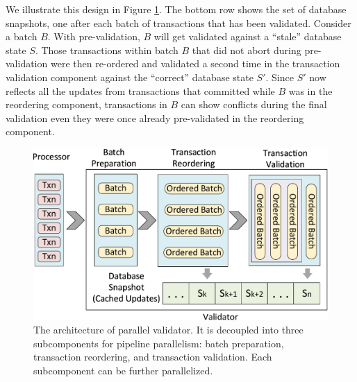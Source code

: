 We illustrate this design in Figure \ref{fig:reorder:validator}. The bottom row shows the set of database snapshots, one after each batch of transactions that has been validated. Consider a batch $B$. With pre-validation, $B$ will get validated against a ``stale'' database state $S$. Those transactions within batch $B$ that did not abort during pre-validation were then re-ordered and validated a second time in the transaction validation component against the ``correct'' database state $S'$. Since $S'$ now reflects all the updates from transactions that committed while $B$ was in the reordering component, transactions in $B$ can show conflicts during the final validation even  they were once already pre-validated in the reordering component.



\begin{figure}[t]
	\centering
	\includegraphics[width=1\columnwidth]{./figures/validator}
	\vspace{-2em}
	\caption{The architecture of parallel validator. It is decoupled into three subcomponents for pipeline parallelism: batch preparation, transaction reordering, and transaction validation. Each subcomponent can be further parallelized.}
	\vspace{-1em}
	\label{fig:reorder:validator}
\end{figure}
